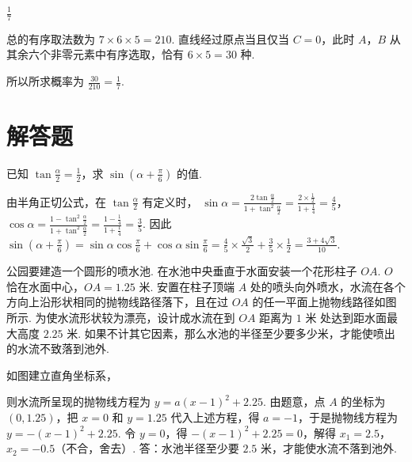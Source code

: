 \begin{answer}
\(\frac{1}{7}\)
\end{answer}

\begin{solution}
总的有序取法数为 \(7\times6\times5=210\). 直线经过原点当且仅当 \(C=0\)，此时 \(A\)，\(B\) 从其余六个非零元素中有序选取，恰有 \(6\times5=30\) 种.

所以所求概率为 \(\frac{30}{210}=\frac17\).
\end{solution}

\section{解答题}

\begin{problem}
已知 \(\tan \frac{\alpha}{2}=\frac{1}{2}\)，求 \(\sin \left(\alpha+\frac{\pi}{6}\right)\) 的值.
\end{problem}

\begin{solution}
由半角正切公式，在 \(\tan\frac{\alpha}{2}\) 有定义时，
\(\sin\alpha=\frac{2\tan\frac{\alpha}{2}}{1+\tan^2\frac{\alpha}{2}}=\frac{2\times\frac12}{1+\frac14}=\frac45\)，
\(\cos\alpha=\frac{1-\tan^2\frac{\alpha}{2}}{1+\tan^2\frac{\alpha}{2}}=\frac{1-\frac14}{1+\frac14}=\frac35\). 因此
\(\sin\left(\alpha+\frac\pi6\right)=\sin\alpha\cos\frac\pi6+\cos\alpha\sin\frac\pi6=\frac45\times\frac{\sqrt3}{2}+\frac35\times\frac12=\frac{3+4\sqrt3}{10}\).
\end{solution}

\begin{problem}
公园要建造一个圆形的喷水池. 在水池中央垂直于水面安装一个花形柱子 \(OA\). \(O\) 恰在水面中心，\(OA=1.25\text{ 米}\). 安置在柱子顶端 \(A\) 处的喷头向外喷水，水流在各个方向上沿形状相同的抛物线路径落下，且在过 \(OA\) 的任一平面上抛物线路径如图所示. 为使水流形状较为漂亮，设计成水流在到 \(OA\) 距离为 \(1\text{ 米}\) 处达到距水面最大高度 \(2.25\text{ 米}\). 如果不计其它因素，那么水池的半径至少要多少米，才能使喷出的水流不致落到池外.

\end{problem}

\begin{solution}
如图建立直角坐标系，


则水流所呈现的抛物线方程为 \(y=a(x-1)^2+2.25\). 由题意，点 \(A\) 的坐标为 \((0,1.25)\)，把 \(x=0\) 和 \(y=1.25\) 代入上述方程，得 \(a=-1\)，于是抛物线方程为 \(y=-(x-1)^2+2.25\). 令 \(y=0\)，得 \(-(x-1)^2+2.25=0\)，解得 \(x_1=2.5\)，\(x_2=-0.5\)（不合，舍去）. 答：水池半径至少要 \(2.5\text{ 米}\)，才能使水流不落到池外.
\end{solution}

